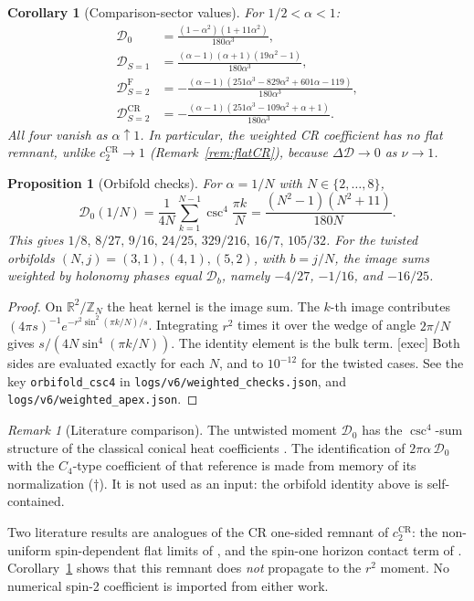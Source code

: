 \documentclass[11pt,a4paper]{article}
\newcommand{\RR}{\mathbb R}
\newcommand{\ZZ}{\mathbb Z}
\newcommand{\Fr}{\mathrm F}
\newcommand{\CR}{\mathrm{CR}}
\newcommand{\loc}[1]{\nolinkurl{#1}}
\theoremstyle{plain}
\newtheorem{proposition}[theorem]{Proposition}
\newtheorem{corollary}[theorem]{Corollary}
\theoremstyle{definition}
\theoremstyle{remark}
\newtheorem{remark}[theorem]{Remark}
\numberwithin{equation}{section}
\begin{document}
\begin{corollary}[Comparison-sector values]
\label{cor:Dvalues}
For \(1/2<\alpha<1\):
\begin{align*}
\mathcal D_0&=\frac{(1-\alpha^2)(1+11\alpha^2)}{180\alpha^3},\\
\mathcal D_{S=1}&=\frac{(\alpha-1)(\alpha+1)(19\alpha^2-1)}{180\alpha^3},\\
\mathcal D^\Fr_{S=2}&=-\frac{(\alpha-1)(251\alpha^3-829\alpha^2+601\alpha-119)}{180\alpha^3},\\
\mathcal D^\CR_{S=2}&=-\frac{(\alpha-1)(251\alpha^3-109\alpha^2+\alpha+1)}{180\alpha^3}.
\end{align*}
All four vanish as \(\alpha\uparrow1\).
In particular, the weighted CR coefficient has \emph{no} flat
remnant, unlike \(c_2^\CR\to1\) (Remark~\ref{rem:flatCR}),
because \(\Delta\mathcal D\to0\) as \(\nu\to1\).
\end{corollary}

\begin{proposition}[Orbifold checks]
\label{prop:orbifold}
For \(\alpha=1/N\) with \(N\in\{2,\dots,8\}\),
\[
\mathcal D_0(1/N)=\frac1{4N}\sum_{k=1}^{N-1}\csc^4\frac{\pi k}{N}
=\frac{(N^2-1)(N^2+11)}{180N}.
\]
This gives \(1/8,\,8/27,\,9/16,\,24/25,\,329/216,\,16/7,\,105/32\).
For the twisted orbifolds \((N,j)=(3,1),(4,1),(5,2)\), with
\(b=j/N\), the image sums weighted by holonomy phases equal
\(\mathcal D_b\), namely \(-4/27\), \(-1/16\), and \(-16/25\).
\end{proposition}

\begin{proof}
On \(\RR^2/\ZZ_N\) the heat kernel is the image sum.
The \(k\)-th image contributes
\((4\pi s)^{-1}e^{-r^2\sin^2(\pi k/N)/s}\).
Integrating \(r^2\) times it over the wedge of angle \(2\pi/N\) gives
\(s/(4N\sin^4(\pi k/N))\).
The identity element is the bulk term.
\textsf{[exec]} Both sides are evaluated exactly for each \(N\),
and to \(10^{-12}\) for the twisted cases.
See the key \texttt{orbifold\_csc4} in
\loc{logs/v6/weighted_checks.json}, and
\loc{logs/v6/weighted_apex.json}.
\end{proof}

\begin{remark}[Literature comparison]
The untwisted moment \(\mathcal D_0\) has the
\(\csc^4\)-sum structure of the classical conical heat coefficients
\cite{Fursaev1994}.
The identification of \(2\pi\alpha\,\mathcal D_0\) with the
\(C_4\)-type coefficient of that reference is made from memory of its
normalization (\(\dagger\)). It is not used as an input: the
orbifold identity above is self-contained.

Two literature results are analogues of the CR one-sided remnant
of \(c_2^\CR\): the non-uniform spin-dependent flat limits of
\cite{FursaevMiele1997}, and the spin-one horizon contact term of
\cite{Kabat}.
Corollary~\ref{cor:Dvalues} shows that this remnant does
\emph{not} propagate to the \(r^2\) moment.
No numerical spin-2 coefficient is imported from either work.
\end{remark}
\end{document}
